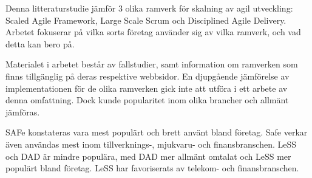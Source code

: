 %
%




\begin{svabstract}

Denna litteraturstudie jämför 3 olika ramverk för skalning av agil utveckling: Scaled Agile Framework, Large Scale Scrum och Disciplined Agile Delivery. Arbetet fokuserar på vilka sorts företag använder sig av vilka ramverk, och vad detta kan bero på.

Materialet i arbetet består av fallstudier, samt information om ramverken som finns tillgänglig på deras respektive webbsidor. En djupgående jämförelse av implementationen för de olika ramverken gick inte att utföra i ett arbete av denna omfattning. Dock kunde popularitet inom olika brancher och allmänt jämföras.

SAFe konstateras vara mest populärt och brett använt bland företag. Safe verkar även användas mest inom tillverknings-, mjukvaru- och finansbranschen.
LeSS och DAD är mindre populära, med DAD mer allmänt omtalat och LeSS mer populärt bland företag. 
LeSS har favoriserats av telekom- och finansbranschen.




\end{svabstract}

